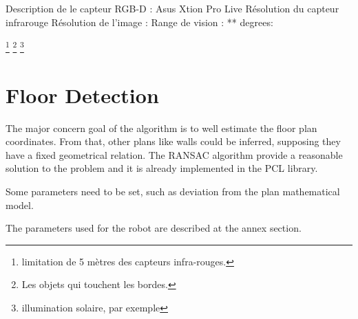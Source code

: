 Description de le capteur RGB-D :
Asus Xtion Pro Live
Résolution du capteur infrarouge
Résolution de l'image :
Range de vision : ** degrees:

\footnote{ limitation de 5 mètres des capteurs infra-rouges.}
\footnote{Les objets qui touchent les bordes.}
\footnote{ illumination solaire, par exemple}


\section { Floor Detection } 

The major concern goal of the algorithm is to well estimate the floor plan coordinates. From that, other plans like walls could be inferred, supposing they have a fixed geometrical relation. The RANSAC algorithm provide a reasonable solution to the problem and it is already implemented in the PCL library.

Some parameters need to be set, such as deviation from the plan mathematical model.

The parameters used for the robot are described at the annex section.

\begin{figure}[H]
\end{figure}

\begin{figure}[H]
\end{figure}

\begin{figure}[H]
\end{figure}


